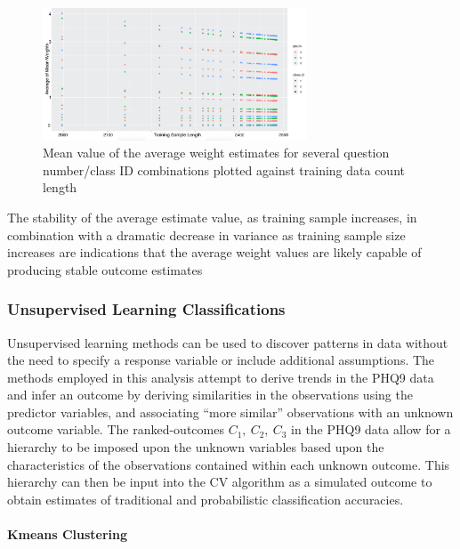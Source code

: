 \documentclass[12pt,]{article}
\let\oldparagraph\paragraph
\renewcommand{\paragraph}[1]{\oldparagraph{#1}\mbox{}}
\begin{document}
\begin{figure}[!h]
\begin{center}
\includegraphics[width=0.7\textwidth]{MeanPlot.jpg}
\end{center}
\caption[Probabilistic Simulation Weight Averages]{Mean value of the average weight estimates for several question number/class ID combinations plotted against training data count length}
\end{figure}

\newpage

The stability of the average estimate value, as training sample
increases, in combination with a dramatic decrease in variance as
training sample size increases are indications that the average weight
values are likely capable of producing stable outcome estimates

\hypertarget{unsupervised-learning-classifications}{%
\subsubsection{Unsupervised Learning
Classifications}\label{unsupervised-learning-classifications}}

Unsupervised learning methods can be used to discover patterns in data
without the need to specify a response variable or include additional
assumptions. The methods employed in this analysis attempt to derive
trends in the PHQ9 data and infer an outcome by deriving similarities in
the observations using the predictor variables, and associating ``more
similar'' observations with an unknown outcome variable. The
ranked-outcomes \(C_{1}, \ C_{2}, \ C_{3}\) in the PHQ9 data allow for a
hierarchy to be imposed upon the unknown variables based upon the
characteristics of the observations contained within each unknown
outcome. This hierarchy can then be input into the CV algorithm as a
simulated outcome to obtain estimates of traditional and probabilistic
classification accuracies.

\hypertarget{kmeans-clustering}{%
\paragraph{Kmeans Clustering}\label{kmeans-clustering}}
\end{document}

